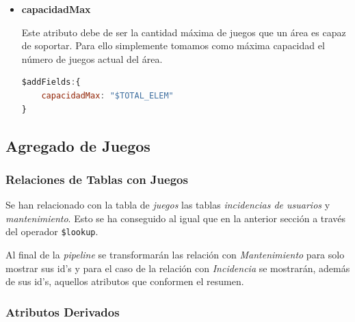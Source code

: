 \documentclass[]{article}
\begin{document}
\begin{itemize}
\begin{enumerate}
\begin{lstlisting}[caption=Creación de nuevo campo en el documento original, language=JavaScript]
\end{lstlisting}
    \end{enumerate}

    \item \textbf{capacidadMax}
    
    Este atributo debe de ser la cantidad máxima de juegos que un área es capaz de soportar. Para ello simplemente tomamos como máxima capacidad el número de juegos actual del área.
    \begin{lstlisting}[language=JavaScript, caption=Cálculo de la capacidad máxima]
$addFields:{
    capacidadMax: "$TOTAL_ELEM"
}
    \end{lstlisting}
\end{itemize}

\subsection{Agregado de Juegos}
\label{subsec:agregado_juego}

\subsubsection{Relaciones de Tablas con Juegos}
\label{subsubsec:relaciones_juego}

Se han relacionado con la tabla de \textit{juegos} las tablas \textit{incidencias de usuarios} y \textit{mantenimiento}. Esto se ha conseguido al igual que en la anterior sección a través del operador \texttt{\$lookup}.

Al final de la \textit{pipeline} se transformarán las relación con \textit{Mantenimiento} para solo mostrar sus id's y para el caso de la relación con \textit{Incidencia} se mostrarán, además de sus id's, aquellos atributos que conformen el resumen. 

\subsubsection{Atributos Derivados}
\label{subsubsec:derivados_juego}
\end{document}
